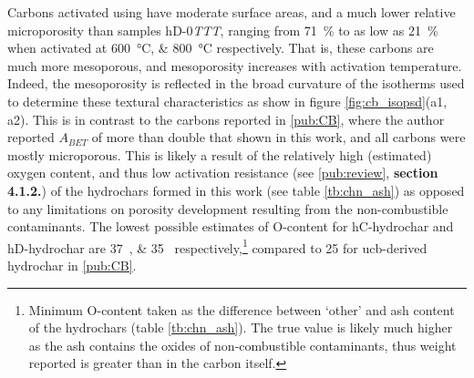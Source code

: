 Carbons activated using  have moderate surface areas, and a much lower relative microporosity than samples hD-0\textit{TTT}, ranging from \qty{71}{\percent} to as low as \qty{21}{\percent} when activated at \qtylist[list-units=single]{600;800}{\degreeCelsius} respectively. That is, these carbons are much more mesoporous, and mesoporosity increases with activation temperature. Indeed, the mesoporosity is reflected in the broad curvature of the  isotherms used to determine these textural characteristics as show in figure \ref{fig:cb_isopsd}(a1, a2). This is in contrast to the carbons reported in \ref{pub:CB}, where the author reported $A_{BET}$ of more than double that shown in this work, and all carbons were mostly microporous. This is likely a result of the relatively high (estimated) oxygen content, and thus low activation resistance (see \ref{pub:review}, \textbf{section 4.1.2.}) of the \glspl{hydrochar} formed in this work (see table \ref{tb:chn_ash}) as opposed to any limitations on porosity development resulting from the non-combustible contaminants. The lowest possible estimates of O-content for hC-hydrochar and hD-hydrochar are \qtylist[list-units=single]{37;35}{\wtpercent} respectively,\footnote{Minimum O-content taken as the difference between `other' and \gls{ash content} of the \glspl{hydrochar} (table \ref{tb:chn_ash}). The true value is likely much higher as the ash contains the oxides of non-combustible contaminants, thus weight reported is greater than in the carbon itself.} compared to \qty{25}{\wtpercent} for \acrshort{ucb}-derived \gls{hydrochar} in \ref{pub:CB}. 


